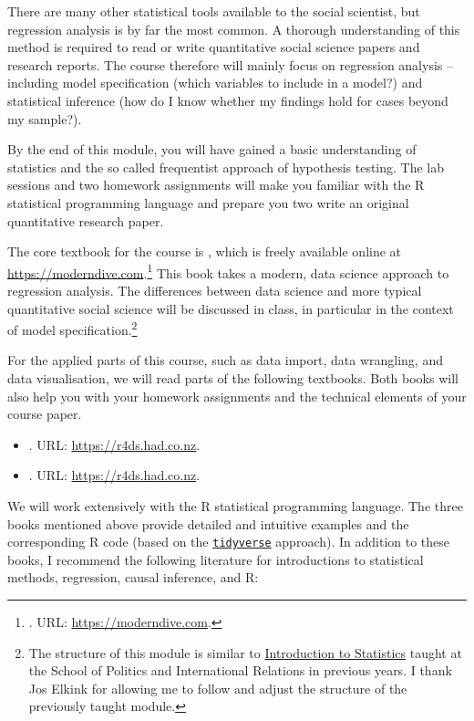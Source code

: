 \documentclass[abstract=on,parskip=full,headings=standardclasses,fontsize=11pt,paper=a4]{scrartcl}
\begin{document}
There are many other statistical tools available to the social scientist, but regression analysis is by far the most common. A thorough understanding of this method is required to read or write quantitative social science papers and research reports. The course therefore will mainly focus on regression analysis -- including model specification (which variables to include in a model?) and statistical inference (how do I know whether my findings hold for cases beyond my sample?).

By the end of this module, you will have gained a basic understanding of statistics and the so called frequentist approach of hypothesis testing. The lab sessions and two homework assignments will make you familiar with the \textsf{R} statistical programming language and prepare you two write an original quantitative research paper. 


The core textbook for the course is \textcite{ismay20}, which is freely available online at \url{https://moderndive.com}.\footnote{. URL: \url{https://moderndive.com}.} This book takes a modern, data science approach to regression analysis. The differences between data science and more typical quantitative social science will be discussed in class, in particular in the context of model specification.\footnote{The structure of this module is similar to \href{http://www.joselkink.net/STATS-Autumn-2019.php}{Introduction to Statistics} taught at the School of Politics and International Relations in previous years. I thank Jos Elkink for allowing me to follow and adjust the structure of the previously taught module.}

For the applied parts of this course, such as data import, data wrangling, and data visualisation, we will read parts of the following textbooks. Both books will also help you with your homework assignments and the technical elements of your course paper. 

\begin{itemize}
\item {}. URL: \url{https://r4ds.had.co.nz}.
\item {}. URL: \url{https://r4ds.had.co.nz}.
\end{itemize}


We will work extensively with the \textsf{R} statistical programming language. The three books mentioned above \autocite{ismay20,wickham17,healy19}   provide detailed and intuitive examples and the corresponding \textsf{R} code (based on the \href{https://www.tidyverse.org}{\texttt{tidyverse}} approach). In addition to these books, I recommend the following literature for introductions to statistical methods, regression, causal inference, and \textsf{R}:
\end{document}
